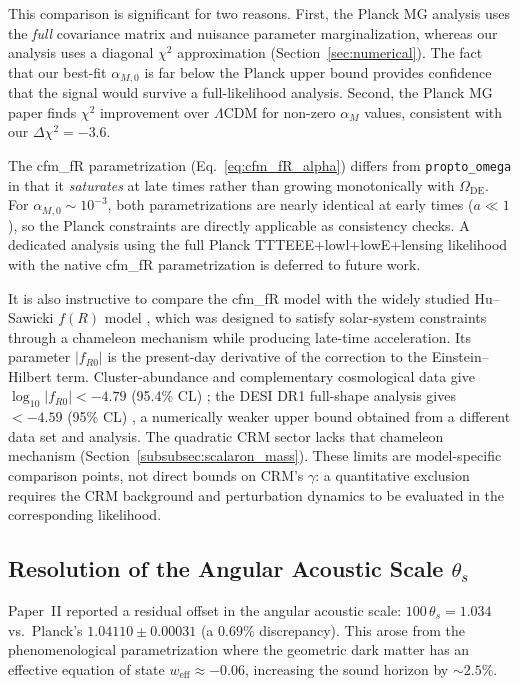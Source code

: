 \documentclass[aps,prd,twocolumn,superscriptaddress,nofootinbib]{revtex4-2}
\begin{document}
This comparison is significant for two reasons. First, the Planck MG analysis uses the \textit{full} covariance matrix and nuisance parameter marginalization, whereas our analysis uses a diagonal $\chi^2$ approximation (Section~\ref{sec:numerical}). The fact that our best-fit $\alpha_{M,0}$ is far below the Planck upper bound provides confidence that the signal would survive a full-likelihood analysis. Second, the Planck MG paper finds $\chi^2$ improvement over $\Lambda$CDM for non-zero $\alpha_M$ values, consistent with our $\Delta\chi^2 = -3.6$.

The cfm\_fR parametrization (Eq.~\ref{eq:cfm_fR_alpha}) differs from \texttt{propto\_omega} in that it \textit{saturates} at late times rather than growing monotonically with $\Omega_{\mathrm{DE}}$. For $\alpha_{M,0} \sim 10^{-3}$, both parametrizations are nearly identical at early times ($a \ll 1$), so the Planck constraints are directly applicable as consistency checks. A dedicated analysis using the full Planck TTTEEE+lowl+lowE+lensing likelihood with the native cfm\_fR parametrization is deferred to future work.

It is also instructive to compare the cfm\_fR model with the widely studied Hu--Sawicki $f(R)$ model \cite{HuSawicki2007}, which was designed to satisfy solar-system constraints through a chameleon mechanism while producing late-time acceleration. Its parameter $|f_{R0}|$ is the present-day derivative of the correction to the Einstein--Hilbert term. Cluster-abundance and complementary cosmological data give $\log_{10}|f_{R0}|<-4.79$ (95.4\% CL) \cite{Cataneo2015}; the DESI DR1 full-shape analysis gives $<-4.59$ (95\% CL) \cite{Gonzalez2026}, a numerically weaker upper bound obtained from a different data set and analysis. The quadratic CRM sector lacks that chameleon mechanism (Section~\ref{subsubsec:scalaron_mass}). These limits are model-specific comparison points, not direct bounds on CRM's $\gamma$: a quantitative exclusion requires the CRM background and perturbation dynamics to be evaluated in the corresponding likelihood.


\subsection{Resolution of the Angular Acoustic Scale $\theta_s$}
\label{subsec:theta_s}

Paper~II reported a residual offset in the angular acoustic scale: $100\,\theta_s = 1.034$ vs.\ Planck's $1.04110 \pm 0.00031$ (a $0.69\%$ discrepancy). This arose from the phenomenological parametrization where the geometric dark matter has an effective equation of state $w_{\mathrm{eff}} \approx -0.06$, increasing the sound horizon by $\sim 2.5\%$.
\end{document}
